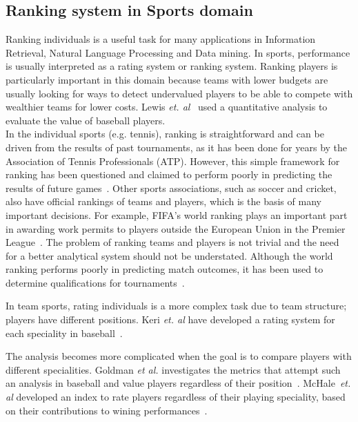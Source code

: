  
\subsection{Ranking system in Sports domain}
Ranking individuals is a useful task for many applications in Information Retrieval, Natural Language Processing and Data mining.
 In sports, performance is usually interpreted as a rating system or ranking system. Ranking players is particularly important in this domain because teams with lower budgets are usually looking for ways to detect undervalued players to be able to compete with wealthier teams for lower costs.
Lewis {\em et. al}~\cite{Lewis2003} used a quantitative analysis to evaluate the value of baseball players. \\
In the individual sports (e.g. tennis), ranking is straightforward and can be driven from the results of past tournaments, as it has been done  for years by the Association of Tennis Professionals (ATP). However, this simple framework for ranking has been questioned and claimed to perform poorly in predicting the results of future games~\cite{McHale2011}. Other sports associations, such as soccer and cricket, also have official rankings of teams and players, which is the basis of many important decisions. For example, FIFA's world ranking plays an important part in awarding work permits to players outside the European Union in the Premier League~\cite{McHale2012}.
 The problem of ranking teams and players is not trivial and the need for a better analytical system should not be understated. Although the world ranking performs poorly in predicting match outcomes, it has been used to determine qualifications for tournaments~\cite{McHale2007}.
 
 In team sports, rating individuals is a more complex task due to team structure; players have different positions. Keri {\em et. al} have developed a rating system for each speciality in baseball~\cite{Keri2006}.
 
 The analysis becomes more complicated when the goal is to compare players with different specialities. Goldman {\em et al.} investigates the metrics that attempt such an analysis in baseball and value players regardless of their position~\cite{Goldman2010}.
  McHale{~\em et. al} developed an index to rate players regardless of their playing speciality, based on their contributions to wining performances~\cite{McHale2012}. 
 


